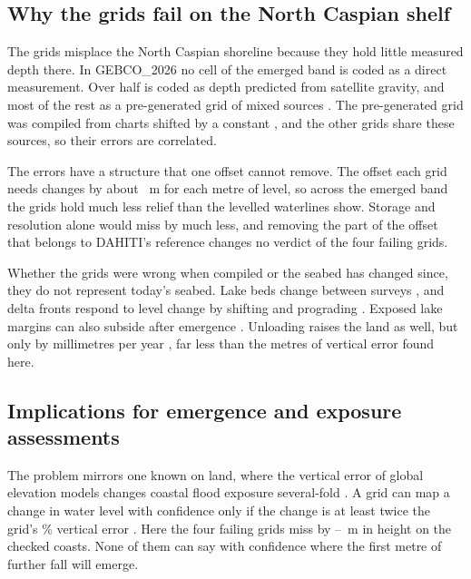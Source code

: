 
\subsection{Why the grids fail on the North Caspian shelf}
\label{sec:dis_why}
The grids misplace the North Caspian shoreline because they hold little measured depth there. In GEBCO\_2026 no cell of the emerged band is coded as a direct measurement. Over half is coded as depth predicted from satellite gravity, and most of the rest as a pre-generated grid of mixed sources \citep{gebco2026}. The pre-generated grid was compiled from charts shifted by a constant \citep{gebco2014_doc}, and the other grids share these sources, so their errors are correlated.

The errors have a structure that one offset cannot remove. The offset each grid needs changes by about ~m for each metre of level, so across the emerged band the grids hold much less relief than the levelled waterlines show. Storage and resolution alone would miss by much less, and removing the part of the offset that belongs to DAHITI's reference changes no verdict of the four failing grids.

Whether the grids were wrong when compiled or the seabed has changed since, they do not represent today's seabed. Lake beds change between surveys \citep{feng2011}, and delta fronts respond to level change by shifting and prograding \citep{kroonenberg1997,overeem2003}. Exposed lake margins can also subside after emergence \citep{closson2026,atzori2015}. Unloading raises the land as well, but only by millimetres per year \citep{nof2012}, far less than the metres of vertical error found here.

\subsection{Implications for emergence and exposure assessments}
\label{sec:dis_impl}
The problem mirrors one known on land, where the vertical error of global elevation models changes coastal flood exposure several-fold \citep{kulp2019,hooijer2021}. A grid can map a change in water level with confidence only if the change is at least twice the grid's \% vertical error \citep{gesch2018}. Here the four failing grids miss by --~m in height on the checked coasts. None of them can say with confidence where the first metre of further fall will emerge.

